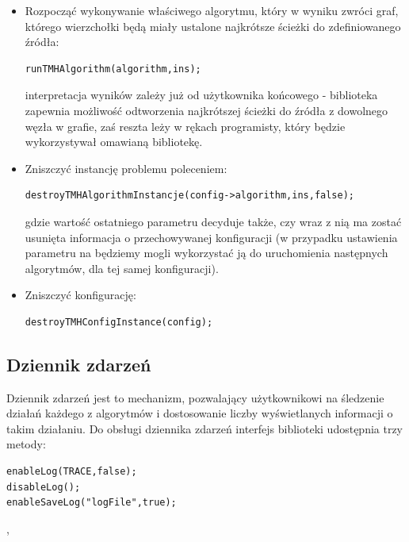 \begin{itemize}
\item Rozpocząć wykonywanie właściwego algorytmu, który w wyniku zwróci graf, którego wierzchołki będą miały ustalone najkrótsze ścieżki do zdefiniowanego źródła:
\begin{lstlisting}[style=customc]
runTMHAlgorithm(algorithm,ins);
\end{lstlisting}
interpretacja wyników zależy już od użytkownika końcowego - biblioteka zapewnia możliwość odtworzenia najkrótszej ścieżki do źródła z dowolnego węzła w grafie, zaś reszta leży w rękach programisty, który będzie wykorzystywał omawianą bibliotekę.
\item Zniszczyć instancję problemu poleceniem:
\begin{lstlisting}[style=customc]
destroyTMHAlgorithmInstancje(config->algorithm,ins,false);
\end{lstlisting}
gdzie wartość ostatniego parametru decyduje także, czy wraz z nią ma zostać usunięta informacja o przechowywanej konfiguracji (w przypadku ustawienia parametru na \KwFalse będziemy mogli wykorzystać ją do uruchomienia następnych algorytmów, dla tej samej konfiguracji).
\item Zniszczyć konfigurację:
\begin{lstlisting}[style=customc]
destroyTMHConfigInstance(config);
\end{lstlisting}
\end{itemize}

\subsection{Dziennik zdarzeń}

Dziennik zdarzeń jest to mechanizm, pozwalający użytkownikowi na śledzenie działań każdego z algorytmów i dostosowanie liczby wyświetlanych informacji o takim działaniu. Do obsługi dziennika zdarzeń interfejs biblioteki udostępnia trzy metody:
\begin{lstlisting}[style=customc]
enableLog(TRACE,false);
disableLog();
enableSaveLog("logFile",true);
\end{lstlisting},

